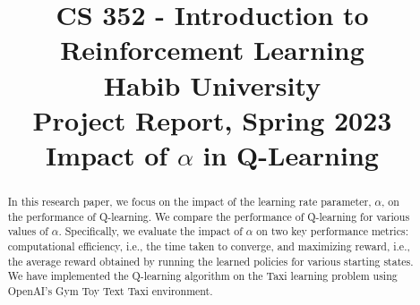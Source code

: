 \documentclass[conference]{IEEEtran}
\begin{document}
\title{CS 352 - Introduction to Reinforcement Learning \\ Habib University \\ {\large Project Report, Spring 2023} \\ {\LARGE Impact of $\alpha$ in Q-Learning}}


\author{
\and
{}
}

\maketitle

\begin{abstract}
 In this research paper, we focus on the impact of the learning rate parameter, $\alpha$, on the performance of Q-learning. We compare the performance of Q-learning for various values of $\alpha$. Specifically, we evaluate the impact of $\alpha$ on two key performance metrics: computational efficiency, i.e., the time taken to converge, and maximizing reward, i.e., the average reward obtained by running the learned policies for various starting states. We have implemented the Q-learning algorithm on the Taxi learning problem using OpenAI's Gym Toy Text Taxi environment.
\end{abstract}
\end{document}
